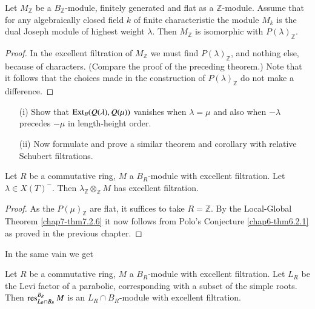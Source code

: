 \begin{corollary}[Uniqueness]\label{chap7-coro7.2.7}
Let $M_{\mathbb{Z}}$ be a $B_{\mathbb{Z}}$-module, finitely generated
and flat as a $\mathbb{Z}$-module. Assume that for any algebraically
closed field $k$ of finite characteristic the module $M_{k}$ is the
dual Joseph module of highest weight $\lambda$. Then $M_{\mathbb{Z}}$
is isomorphic with $P(\lambda)_{\mathbb{Z}}$.
\end{corollary}

\begin{proof}
In the excellent filtration of $M_{\mathbb{Z}}$ we must find
$P(\lambda)_{\mathbb{Z}}$, and nothing else, because of
characters. (Compare the proof of the preceding theorem.) Note that it
follows that the choices made in the construction of
$P(\lambda)_{\mathbb{Z}}$ do not make a difference.
\end{proof}

\begin{exercise}\label{chap7-exer7.2.8}
\begin{itemize}
\item[(i)] Show that $\operatorname{Ext}_{B}(Q(\lambda),Q(\mu))$ vanishes when
  $\lambda=\mu$ and also when $-\lambda$ precedes $-\mu$ in
  length-height order.

\item[(ii)] Now formulate and prove a similar theorem and corollary
  with relative Schubert filtrations.
\end{itemize}
\end{exercise}

\begin{theorem}\label{chap7-thm7.2.9}
Let $R$ be a commutative ring, $M$ a $B_{R}$-module with excellent
filtration. Let $\lambda\in X(T)^{-}$. Then
$\lambda_{\mathbb{Z}}\otimes_{\mathbb{Z}}M$ has excellent filtration.
\end{theorem}

\begin{proof}
As the $P(\mu)_{\mathbb{Z}}$ are flat, it suffices to take
$R=\mathbb{Z}$. By the Local-Global Theorem \ref{chap7-thm7.2.6} it
now follows from Polo's Conjecture \ref{chap6-thm6.2.1} as proved in
the previous chapter.
\end{proof}

In the same vain we get

\begin{theorem}\label{chap7-thm7.2.10}
Let $R$ be a commutative ring, $M$ a $B_{R}$-module with excellent
filtration. Let $L_{R}$ be the Levi factor of a parabolic,
corresponding with a subset of the simple roots. Then
$\operatorname{res}^{B_{R}}_{L_{R}\cap B_{R}}M$ is an $L_{R}\cap B_{R}$-module with
excellent filtration.
\end{theorem}

